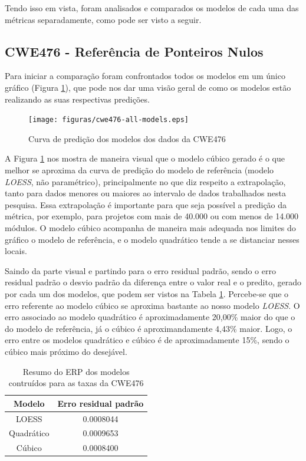 Tendo isso em vista, foram analisados e comparados os modelos de cada uma das
métricas separadamente, como pode ser visto a seguir.

\subsection{CWE476 - Referência de Ponteiros Nulos}\label{comparacaocwe476}

Para iniciar a comparação foram confrontados todos os modelos em um único
gráfico (Figura \ref{fig:cwe476-all-models}), que pode nos dar uma visão geral de
como os modelos estão realizando as suas respectivas predições.

\begin{figure}[h]
  \centering
  \texttt{[image: figuras/cwe476-all-models.eps]}
      \caption{Curva de predição dos modelos dos dados da CWE476}
  \label{fig:cwe476-all-models}
\end{figure}

A Figura \ref{fig:cwe476-all-models} nos mostra de maneira visual que o modelo
cúbico gerado é o que melhor se aproxima da curva de predição do modelo de
referência (modelo \textit{LOESS}, não paramétrico), principalmente no que diz
respeito a extrapolação, tanto para dados menores ou maiores ao intervalo de
dados trabalhados nesta pesquisa. Essa extrapolação é importante para que seja
possível a predição da métrica, por exemplo, para projetos com mais de 40.000 ou
com menos de 14.000 módulos. O modelo cúbico acompanha de maneira mais adequada
nos limites do gráfico o modelo de referência, e o modelo quadrático tende a se
distanciar nesses locais.

Saindo da parte visual e partindo para o erro residual padrão, sendo o erro
residual padrão o desvio padrão da diferença entre o valor real e o predito,
gerado por cada um dos modelos, que podem ser vistos na Tabela
\ref{tab:cwe476-erros}. Percebe-se que o erro referente ao modelo cúbico se
aproxima bastante ao nosso modelo \textit{LOESS}. O erro
associado ao modelo quadrático é aproximadamente 20,00\% maior do que o do
modelo de referência, já o cúbico é aproximandamente 4,43\% maior. Logo, o erro
entre os modelos quadrático e cúbico é de aproximadamente 15\%, sendo o cúbico
mais próximo do desejável.

\begin{table}[h]
 \centering
 \begin{tabular}{cc}
  \hline
  \rowcolor[HTML]{EFEFEF} 
  {Modelo} & {Erro residual padrão} \\ \hline
  {LOESS}  & 0.0008044                  \\ \hline
  Quadrático   & 0.0009653                  \\ \hline
  Cúbico       & 0.0008400                \\ \hline 
 \end{tabular}
 \caption{Resumo do ERP dos modelos contruídos para as taxas da
 CWE476}
 \label{tab:cwe476-erros}
\end{table}

